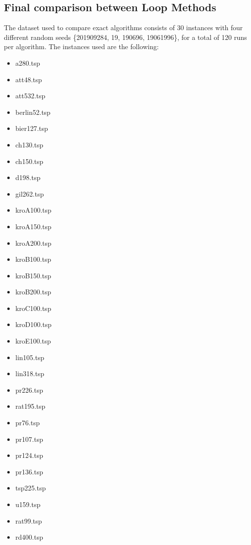 \subsection{Final comparison between Loop Methods}
\label{LMcomparision}
The dataset used to compare exact algorithms consists of 30 instances with four different random seeds \{201909284, 19, 190696, 19061996\}, for a total of 120 runs per algorithm. The instances used are the following:
 \begin{multicols}{3}
    \begin{itemize}
        \item a280.tsp
        \item att48.tsp
        \item att532.tsp
        \item berlin52.tsp
        \item bier127.tsp
        \item ch130.tsp
        \item ch150.tsp
        \item d198.tsp
        \item gil262.tsp
        \item kroA100.tsp
        \item kroA150.tsp
        \item kroA200.tsp
        \item kroB100.tsp 
        \item kroB150.tsp
        \item kroB200.tsp
        \item kroC100.tsp
        \item kroD100.tsp
        \item kroE100.tsp 
        \item lin105.tsp
        \item lin318.tsp 
        \item pr226.tsp 
        \item rat195.tsp 
        \item pr76.tsp 
        \item pr107.tsp 
        \item pr124.tsp
        \item pr136.tsp
        \item tsp225.tsp
        \item u159.tsp
        \item rat99.tsp
        \item rd400.tsp
    \end{itemize}
    \end{multicols}

